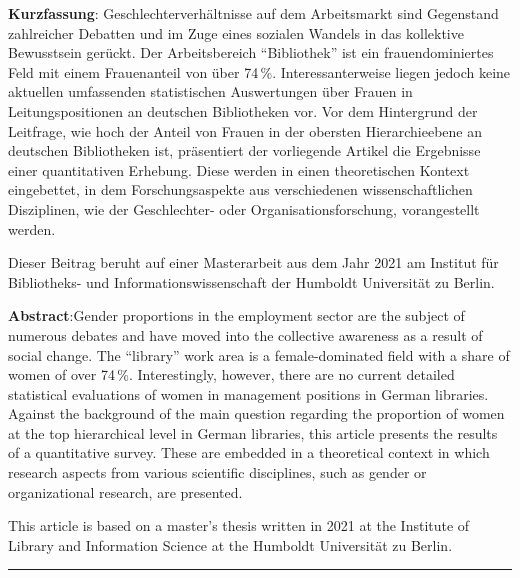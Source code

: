 \textbf{Kurzfassung}: Geschlechterverhältnisse auf dem Arbeitsmarkt sind Gegenstand zahlreicher Debatten und im Zuge eines sozialen Wandels in das kollektive Bewusstsein gerückt. Der Arbeitsbereich \enquote{Bibliothek} ist ein frauendominiertes Feld mit einem Frauenanteil von über 74\,\%. Interessanterweise liegen jedoch keine aktuellen umfassenden statistischen Auswertungen über Frauen in Leitungspositionen an deutschen Bibliotheken vor. Vor dem Hintergrund der Leitfrage, wie hoch der Anteil von Frauen in der obersten Hierarchieebene an deutschen Bibliotheken ist, präsentiert der vorliegende Artikel die Ergebnisse einer quantitativen Erhebung. Diese werden in einen theoretischen Kontext eingebettet, in dem Forschungsaspekte aus verschiedenen wissenschaftlichen Disziplinen, wie der Geschlechter- oder Organisationsforschung, vorangestellt werden.

Dieser Beitrag beruht auf einer Masterarbeit aus dem Jahr 2021 am Institut für Bibliotheks- und Informationswissenschaft der Humboldt Universität zu Berlin.

\textbf{Abstract}:Gender proportions in the employment sector are the subject of numerous debates and have moved into the collective awareness as a result of social change. The \enquote{library} work area is a female-dominated field with a share of women of over 74\,\%. Interestingly, however, there are no current detailed statistical evaluations of women in management positions in German libraries. Against the background of the main question regarding the proportion of women at the top hierarchical level in German libraries, this article presents the results of a quantitative survey. These are embedded in a theoretical context in which research aspects from various scientific disciplines, such as gender or organizational research, are presented.

This article is based on a master's thesis written in 2021 at the Institute of Library and Information Science at the Humboldt Universität zu Berlin.

\begin{center}\rule{0.5\linewidth}{0.5pt}\end{center}